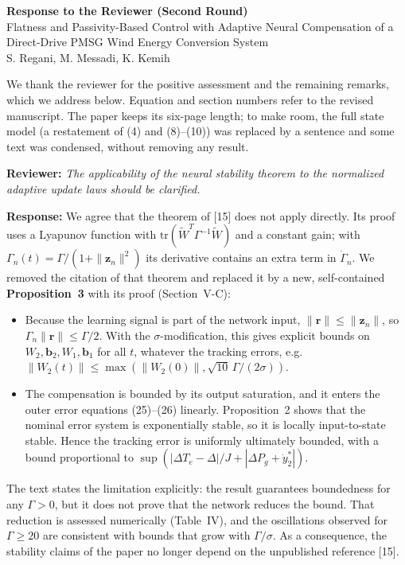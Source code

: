 \documentclass[11pt,a4paper]{article}
\newcommand{\rev}[1]{\par\medskip\noindent\textbf{Reviewer:} \emph{#1}\par\smallskip\noindent\textbf{Response:} }
\begin{document}
\begin{center}
{\Large\bfseries Response to the Reviewer (Second Round)}\\[4pt]
Flatness and Passivity-Based Control with Adaptive Neural Compensation of a Direct-Drive PMSG Wind Energy Conversion System\\[2pt]
S. Regani, M. Messadi, K. Kemih
\end{center}

We thank the reviewer for the positive assessment and the remaining remarks, which we address below.
Equation and section numbers refer to the revised manuscript. The paper keeps its six-page length;
to make room, the full state model (a restatement of (4) and (8)--(10)) was replaced by a sentence and
some text was condensed, without removing any result.

\rev{The applicability of the neural stability theorem to the normalized adaptive update laws should be clarified.}
We agree that the theorem of [15] does not apply directly. Its proof uses a Lyapunov function with
$\mathrm{tr}(\tilde W^T\Gamma^{-1}\tilde W)$ and a constant gain; with $\Gamma_n(t)=\Gamma/(1+\|\mathbf z_n\|^2)$
its derivative contains an extra term in $\dot\Gamma_n$. We removed the citation of that theorem and
replaced it by a new, self-contained \textbf{Proposition~3} with its proof (Section~V-C):
\begin{itemize}
\item[(i)] Because the learning signal is part of the network input, $\|\mathbf r\|\le\|\mathbf z_n\|$,
so $\Gamma_n\|\mathbf r\|\le\Gamma/2$. With the $\sigma$-modification, this gives explicit bounds on
$W_2,\mathbf b_2,W_1,\mathbf b_1$ for all $t$, whatever the tracking errors, e.g.
$\|W_2(t)\|\le\max(\|W_2(0)\|,\sqrt{10}\,\Gamma/(2\sigma))$.
\item[(ii)] The compensation is bounded by its output saturation, and it enters the outer error
equations (25)--(26) linearly. Proposition~2 shows that the nominal error system is exponentially
stable, so it is locally input-to-state stable. Hence the tracking error is uniformly ultimately bounded,
with a bound proportional to $\sup(|\Delta T_e-\Delta|/J+|\Delta P_g+\dot y_2^*|)$.
\end{itemize}
The text states the limitation explicitly: the result guarantees boundedness for any $\Gamma>0$, but it
does not prove that the network reduces the bound. That reduction is assessed numerically (Table~IV),
and the oscillations observed for $\Gamma\ge20$ are consistent with bounds that grow with $\Gamma/\sigma$.
As a consequence, the stability claims of the paper no longer depend on the unpublished reference [15].
\end{document}
